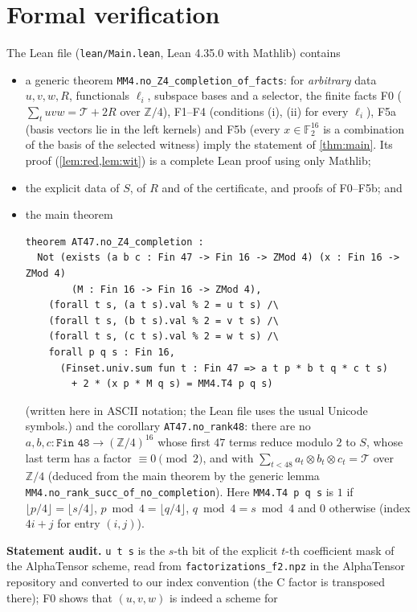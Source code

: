 \documentclass[11pt]{article}
\numberwithin{equation}{section}
\theoremstyle{definition}
\theoremstyle{remark}
\newcommand{\F}{\mathbb F}
\newcommand{\Z}{\mathbb Z}
\newcommand{\T}{\mathcal T}
\begin{document}
\section{Formal verification}
The Lean file (\texttt{lean/Main.lean}, Lean 4.35.0 with Mathlib) contains
\begin{itemize}
\item a generic theorem \texttt{MM4.no\_Z4\_completion\_of\_facts}: for \emph{arbitrary} data
$u,v,w,R$, functionals $\ell_i$, subspace bases and a selector, the finite facts
F0 ($\sum_t u v w=\T+2R$ over $\Z/4$), F1--F4 (conditions (i), (ii) for every $\ell_i$),
F5a (basis vectors lie in the left kernels) and F5b (every $x\in\F_2^{16}$ is a combination of the basis
of the selected witness) imply the statement of \cref{thm:main}. Its proof (\cref{lem:red,lem:wit}) is a
complete Lean proof using only Mathlib;
\item the explicit data of $S$, of $R$ and of the certificate, and proofs of F0--F5b; and
\item the main theorem
{\small\begin{verbatim}
theorem AT47.no_Z4_completion :
  Not (exists (a b c : Fin 47 -> Fin 16 -> ZMod 4) (x : Fin 16 -> ZMod 4)
        (M : Fin 16 -> Fin 16 -> ZMod 4),
    (forall t s, (a t s).val % 2 = u t s) /\
    (forall t s, (b t s).val % 2 = v t s) /\
    (forall t s, (c t s).val % 2 = w t s) /\
    forall p q s : Fin 16,
      (Finset.univ.sum fun t : Fin 47 => a t p * b t q * c t s)
        + 2 * (x p * M q s) = MM4.T4 p q s)
\end{verbatim}}
(written here in ASCII notation; the Lean file uses the usual Unicode symbols.)
and the corollary \texttt{AT47.no\_rank48}: there are no $a,b,c:\texttt{Fin 48}\to(\Z/4)^{16}$ whose first
$47$ terms reduce modulo $2$ to $S$, whose last term has a factor $\equiv0\pmod 2$, and with
$\sum_{t<48}a_t\otimes b_t\otimes c_t=\T$ over $\Z/4$ (deduced from the main theorem by the generic
lemma
\texttt{MM4.no\_rank\_succ\_\allowbreak of\_no\_completion}). Here \texttt{MM4.T4 p q s} is $1$ if $\lfloor p/4\rfloor=\lfloor s/4\rfloor$, $p\bmod 4=\lfloor q/4\rfloor$,
$q\bmod 4=s\bmod 4$ and $0$ otherwise (index $4i+j$ for
entry $(i,j)$).
\end{itemize}
\textbf{Statement audit.} \texttt{u t s} is the $s$-th bit of the explicit $t$-th coefficient mask of the
AlphaTensor scheme, read from \texttt{factorizations\_f2.npz} in the AlphaTensor repository and converted to
our index convention (the C factor is transposed there); F0 shows that $(u,v,w)$ is indeed a scheme for
\end{document}

